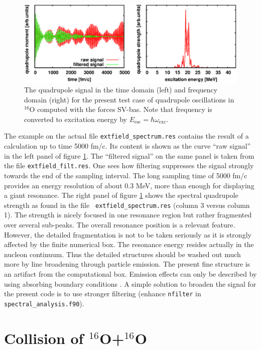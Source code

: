 \documentclass[A4]{elsarticle}
\begin{document}
\begin{figure}
\centerline{\includegraphics[width=\linewidth]{testcase-16O.eps}}
\caption{\label{fig:testcase-16O}
The quadrupole signal in the time domain (left) and frequency
domain (right) for the present test case of quadrupole oscillations
in $^{16}$O computed with the forces SV-bas. Note that frequency is
converted to excitation energy by $E_\mathrm{esc}=\hbar\omega_\mathrm{exc}$.
}
\end{figure}
The example on the actual file {\tt extfield\_spectrum.res} contains
the result of a calculation up to time 5000 fm/c.  Its content is
shown as the curve ``raw signal'' in the left panel of figure
\ref{fig:testcase-16O}. The ``filtered signal'' on the same panel is
taken from the file {\tt extfield\_filt.res}. One sees how filtering
suppresses the signal strongly towards the end of the sampling
interval. The long sampling time of 5000 fm/c provides an energy
resolution of about 0.3 MeV, more than enough for displaying a giant
resonance. The right panel of figure \ref{fig:testcase-16O} shows the
spectral quadrupole strength as found in the file {\tt
  extfield\_spectrum.res} (column 3 versus column 1). The strength is
nicely focused in one resonance region but rather fragmented over
several sub-peaks. The overall resonance position is a relevant
feature. However, the detailed fragmentation is not to be taken
seriously as it is strongly affected by the finite numerical box. The
resonance energy resides actually in the nucleon continuum. Thus the
detailed structures should be washed out much more by line broadening
through particle emission. The present fine structure is an artifact
from the computational box.  Emission effects can only be described by
using absorbing boundary conditions \cite{Rei06a}. A simple solution
to broaden the signal for the present code is to use stronger
filtering (enhance {\tt nfilter} in {\tt spectral\_analysis.f90}).

\section{Collision of $^{16}$O+$^{16}$O}
\end{document}
